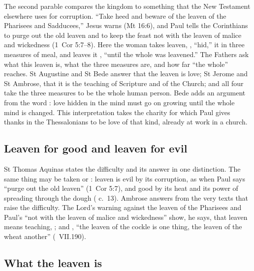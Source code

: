 
The second parable compares the kingdom to something that the New Testament
elsewhere uses for corruption. ``Take heed and beware of the leaven of the
Pharisees and Sadducees,'' Jesus warns (Mt 16:6), and Paul tells the Corinthians to purge out the old
leaven and to keep the feast not with the leaven of malice and wickedness
(1~Cor 5:7--8). Here the woman takes leaven, , ``hid,'' it in
three measures of meal, and leaves it ,
``until the whole was leavened.'' The Fathers ask what this leaven is, what
the three measures are, and how far ``the whole'' reaches. St Augustine and St
Bede answer that the leaven is love; St Jerome and St Ambrose, that it is the
teaching of Scripture and of the Church; and all four take the three measures
to be the whole human person. Bede adds an argument from the word
: love hidden in the mind must go on growing until the whole mind
is changed. This interpretation takes the charity for which Paul gives thanks
in the Thessalonians to be love of that kind, already at work in a church.

\subsection{Leaven for good and leaven for evil}
\label{sec:leaven-difficulty}

St Thomas Aquinas states the difficulty and its answer in one distinction.
The same thing may be taken  or : leaven is
evil by its corruption, as when Paul says ``purge out the old leaven'' (1~Cor
5:7), and good by its heat and its power of spreading through the dough
( c.~13). Ambrose answers from the very texts
that raise the difficulty. The Lord's warning against the leaven of the
Pharisees and Paul's ``not with the leaven of malice and wickedness'' show,
he says, that leaven means teaching, ; and , ``the
leaven of the cockle is one thing, the leaven of the wheat another''
(~VII.190).

\subsection{What the leaven is}
\label{sec:leaven-what}

